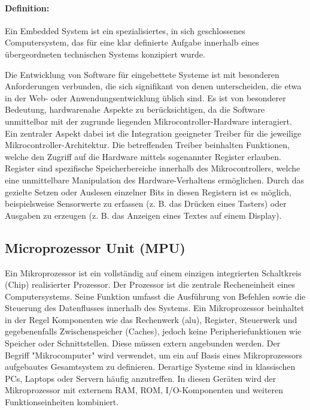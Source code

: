 \paragraph{Definition:}
Ein Embedded System ist ein spezialisiertes, in sich geschlossenes Computersystem, das für eine klar definierte Aufgabe innerhalb eines übergeordneten technischen Systems konzipiert wurde.

\vspace{6 mm}

Die Entwicklung von Software für eingebettete Systeme ist mit besonderen Anforderungen verbunden, die sich signifikant von denen unterscheiden, die etwa in der Web- oder Anwendungsentwicklung üblich sind.
Es ist von besonderer Bedeutung, hardwarenahe Aspekte zu berücksichtigen, da die Software unmittelbar mit der zugrunde liegenden Mikrocontroller-Hardware interagiert.
Ein zentraler Aspekt dabei ist die Integration geeigneter Treiber für die jeweilige Mikrocontroller-Architektur.
Die betreffenden Treiber beinhalten Funktionen, welche den Zugriff auf die Hardware mittels sogenannter Register erlauben.
Register sind spezifische Speicherbereiche innerhalb des Mikrocontrollers, welche eine unmittelbare Manipulation des Hardware-Verhaltens ermöglichen.
Durch das gezielte Setzen oder Auslesen einzelner Bits in diesen Registern ist es möglich, beispielsweise Sensorwerte zu erfassen (z. B. das Drücken eines Tasters) oder Ausgaben zu erzeugen (z. B. das Anzeigen eines Textes auf einem Display).


\subsection{Microprozessor Unit (MPU)}
Ein Mikroprozessor ist ein vollständig auf einem einzigen integrierten Schaltkreis (Chip) realisierter Prozessor.
Der Prozessor ist die zentrale Recheneinheit eines Computersystems.
Seine Funktion umfasst die Ausführung von Befehlen sowie die Steuerung des Datenflusses innerhalb des Systems. 
Ein Mikroprozessor beinhaltet in der Regel Komponenten wie das Rechenwerk (\gls{alu}), Register, Steuerwerk und gegebenenfalls Zwischenspeicher (Caches), jedoch keine Peripheriefunktionen wie Speicher oder Schnittstellen. 
Diese müssen extern angebunden werden.
Der Begriff "Mikrocomputer" wird verwendet, um ein auf Basis eines Mikroprozessors aufgebautes Gesamtsystem zu definieren. 
Derartige Systeme sind in klassischen PCs, Laptops oder Servern häufig anzutreffen.
In diesen Geräten wird der Mikroprozessor mit externem RAM, ROM, I/O-Komponenten und weiteren Funktionseinheiten kombiniert.

